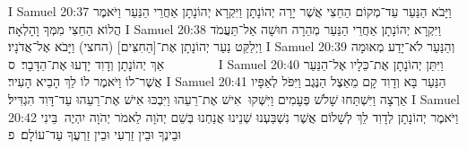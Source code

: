 I Samuel 20:37	וַיָּבֹא הַנַּעַר עַד־מְקוֹם הַחֵצִי אֲשֶׁר יָרָה יְהוֹנָתָן וַיִּקְרָא יְהוֹנָתָן אַחֲרֵי הַנַּעַר וַיֹּאמֶר הֲלוֹא הַחֵצִי מִמְּךָ וָהָלְאָה׃
I Samuel 20:38	וַיִּקְרָא יְהוֹנָתָן אַחֲרֵי הַנַּעַר מְהֵרָה חוּשָׁה אַל־תַּעֲמֹד וַיְלַקֵּט נַעַר יְהוֹנָתָן אֶת־[הַחִצִּים] (החצי) וַיָּבֹא אֶל־אֲדֹנָיו׃
I Samuel 20:39	וְהַנַּעַר לֹא־יָדַע מְאוּמָה אַךְ יְהוֹנָתָן וְדָוִד יָדְעוּ אֶת־הַדָּבָר׃ {ס}        
I Samuel 20:40	וַיִּתֵּן יְהוֹנָתָן אֶת־כֵּלָיו אֶל־הַנַּעַר אֲשֶׁר־לוֹ וַיֹּאמֶר לוֹ לֵךְ הָבֵיא הָעִיר׃
I Samuel 20:41	הַנַּעַר בָּא וְדָוִד קָם מֵאֵצֶל הַנֶּגֶב וַיִּפֹּל לְאַפָּיו אַרְצָה וַיִּשְׁתַּחוּ שָׁלֹשׁ פְּעָמִים וַיִּשְּׁקוּ  אִישׁ אֶת־רֵעֵהוּ וַיִּבְכּוּ אִישׁ אֶת־רֵעֵהוּ עַד־דָּוִד הִגְדִּיל׃
I Samuel 20:42	וַיֹּאמֶר יְהוֹנָתָן לְדָוִד לֵךְ לְשָׁלוֹם אֲשֶׁר נִשְׁבַּעְנוּ שְׁנֵינוּ אֲנַחְנוּ בְּשֵׁם יְהֹוָה לֵאמֹר יְהֹוָה יִהְיֶה  בֵּינִי וּבֵינֶךָ וּבֵין זַרְעִי וּבֵין זַרְעֲךָ עַד־עוֹלָם׃ {פ}
